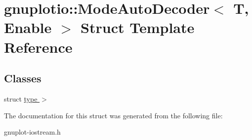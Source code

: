 \hypertarget{structgnuplotio_1_1ModeAutoDecoder}{}\section{gnuplotio\+:\+:Mode\+Auto\+Decoder$<$ T, Enable $>$ Struct Template Reference}
\label{structgnuplotio_1_1ModeAutoDecoder}
\subsection*{Classes}
\begin{DoxyCompactItemize}
\item 
struct \hyperlink{structgnuplotio_1_1ModeAutoDecoder_1_1type_01_4}{type $>$}
\end{DoxyCompactItemize}


The documentation for this struct was generated from the following file\+:\begin{DoxyCompactItemize}
\item 
gnuplot-\/iostream.\+h\end{DoxyCompactItemize}

